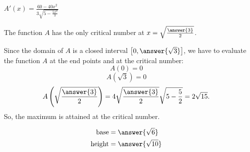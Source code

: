 \documentclass{ximera}
\begin{document}
\begin{exercise}
\begin{hint}
$A'(x)=\frac{60-40x^2}{3\sqrt{5-  \frac{5x^2}{3}}}$

The function $A$ has the only critical number at $x=\sqrt{\frac{\answer{3}}{2}}$.
\end{hint}
\begin{hint}

Since the domain of $A$ is a closed interval $\left[0,\answer{\sqrt{3}}\right]$, 
we have to evaluate the function $A$ at the end points and at the critical number:
 \[
A(0)=0
  \]
  \[
A(\sqrt{3})=0
  \]
  \[
A\left(\sqrt{\frac{\answer{3}}{2}}\right)=4\sqrt{\frac{\answer{3}}{2}}\sqrt{5-  \frac{5}{2}}=2\sqrt{15}.
  \]
  So, the maximum is attained at the critical number.
\end{hint}
  \begin{prompt}
  \begin{align*}
  \text{base}&= \answer{\sqrt{6}}\\
  \text{height} &= \answer{\sqrt{10}}
  \end{align*}
  \end{prompt}
\end{exercise}
\end{document}
